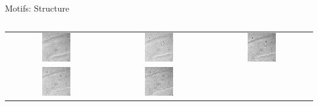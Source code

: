\documentclass{beamer}
\begin{document}
\begin{frame}{Motifs: Structure}
\begin{columns}
\begin{tabular}{ccc}
\includegraphics[width=0.3\textwidth]{fracture2_z=0um.jpg}&%
\includegraphics[width=0.3\textwidth]{fracture2_z=15um.jpg}&%
\includegraphics[width=0.3\textwidth]{fracture2_z=30um.jpg}\\
\includegraphics[width=0.3\textwidth]{fracture2_z=45um.jpg}&%
\includegraphics[width=0.3\textwidth]{fracture2_z=60um.jpg}&%

\end{tabular}
\end{columns}
\end{frame}
\end{document}

